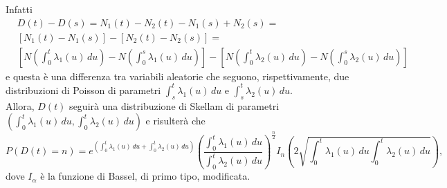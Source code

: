 \documentclass[12pt]{homework}
\begin{document}
\begin{enumerate}
   Infatti
   \begin{align*}
   &D\left(t\right)-D\left(s\right)=  N_{1}\left(t\right)-N_{2}\left(t\right)-N_{1}\left(s\right)+N_{2}\left(s\right)=\\
  &[ N_{1}\left(t\right)-N_{1}\left(s\right)]-[N_{2}\left(t\right)-N_{2}\left(s\right)]=  \\
  &[N\left(\int_{0}^{t}\lambda_{1}\left(u\right) \,du\right) - N\left(\int_{0}^{s}\lambda_{1}\left(u\right) \,du \right)]-[N\left(\int_{0}^{t}\lambda_{2}\left(u\right) \,du\right) - N\left(\int_{0}^{s}\lambda_{2}\left(u\right) \,du \right)]
   \end{align*}
   e questa è una differenza tra variabili aleatorie che seguono, rispettivamente, due distribuzioni di Poisson di parametri $\int_{s}^{t}\lambda_{1}\left(u\right) \,du$ e $\int_{s}^{t}\lambda_{2}\left(u\right) \,du$.\\
   Allora, $D\left(t\right)$ seguirà una distribuzione di Skellam di parametri $\left(\int_{0}^{t}\lambda_{1}\left(u\right) \,du,\int_{0}^{t}\lambda_{2}\left(u\right) \,du \right)$ e risulterà che
   \begin{equation*}
   P\left(D\left(t\right)=n\right)=e^{\left(\int_{0}^{t}\lambda_{1}\left(u\right) \,du + \int_{0}^{t}\lambda_{2}\left(u\right) \,du \right)}\left(\frac{\int_{0}^{t}\lambda_{1}\left(u\right) \,du}{\int_{0}^{t}\lambda_{2}\left(u\right) \,du }\right)^{\frac{n}{2}}I_{n}\left(2\sqrt{\int_{0}^{t}\lambda_{1}\left(u\right) \,du \int_{0}^{t}\lambda_{2}\left(u\right) \,du}\right),
   \end{equation*}
   dove $I_{\alpha}$ è la funzione di Bassel, di primo tipo, modificata.
   

\end{enumerate}
\end{document}
